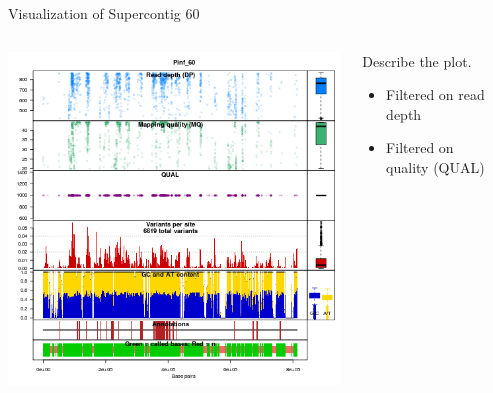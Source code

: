 \documentclass[final,t]{beamer}
\begin{document}
\begin{frame}{}
\begin{columns}[t]
\begin{column}{.28\linewidth}
    \end{column}

    \begin{column}{.4\linewidth}


      \begin{block}{Visualization of Supercontig 60}
        \begin{columns}[t]
          \begin{column}[T]{0.6\linewidth}
            \includegraphics[width=0.9\linewidth, height=0.6\linewidth]{cplots3.png}
          \end{column}
          \begin{column}[T]{0.4\linewidth}
            Describe the plot.
            \begin{itemize}
              \item Filtered on read depth
              \item Filtered on quality (QUAL)
            \end{itemize}
          \end{column}
        \end{columns}
      \end{block}


\end{column}
\end{columns}
\end{frame}
\end{document}
